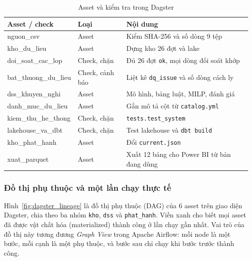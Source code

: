 \begin{table}[htbp]
\centering
\small
\caption{Asset và kiểm tra trong Dagster}
\label{tab:dagster}
\begin{tabularx}{\textwidth}{|>{\raggedright\arraybackslash\ttfamily}m{3.6cm}|>{\raggedright\arraybackslash}m{2.4cm}|L|}
\hline
\textbf{\rmfamily Asset / check} & \textbf{\rmfamily Loại} & \textbf{\rmfamily Nội dung} \\
\hline
nguon\_csv & Asset & Kiểm SHA-256 và số dòng 9 tệp \\
\hline
kho\_du\_lieu & Asset & Dựng kho 26 đợt và lake \\
\hline
doi\_soat\_cac\_lop & Check, chặn & Đủ 26 đợt \texttt{ok}, mọi dòng đối soát khớp \\
\hline
bat\_thuong\_du\_lieu & Check, cảnh báo & Liệt kê \texttt{dq\_issue} và số dòng cách ly \\
\hline
dss\_khuyen\_nghi & Asset & Mô hình, bảng luật, MILP, đánh giá \\
\hline
danh\_muc\_du\_lieu & Asset & Gắn mô tả cột từ \texttt{catalog.yml} \\
\hline
kiem\_thu\_he\_thong & Check, chặn & \texttt{tests.test\_system} \\
\hline
lakehouse\_va\_dbt & Check, chặn & Test lakehouse và \texttt{dbt build} \\
\hline
kho\_phat\_hanh & Asset & Đổi \texttt{current.json} \\
\hline
xuat\_parquet & Asset & Xuất 12 bảng cho Power BI từ bản đang dùng \\
\hline
\end{tabularx}
\end{table}

\subsubsection*{Đồ thị phụ thuộc và một lần chạy thực tế}
Hình~\ref{fig:dagster_lineage} là đồ thị phụ thuộc (DAG) của 6 asset trên giao diện Dagster, chia theo ba nhóm \texttt{kho}, \texttt{dss} và \texttt{phat\_hanh}. Viền xanh cho biết mọi asset đã được vật chất hóa (materialized) thành công ở lần chạy gần nhất. Vai trò của đồ thị này tương đương \emph{Graph View} trong Apache Airflow: mỗi node là một bước, mỗi cạnh là một phụ thuộc, và bước sau chỉ chạy khi bước trước thành công.

